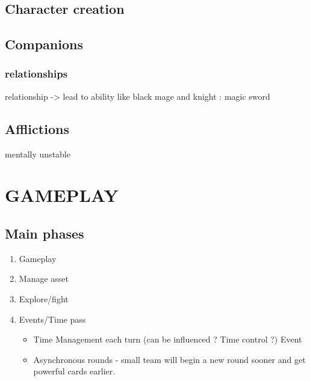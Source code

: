 \documentclass{report}
\begin{document}
	\section{Character creation}
	\section{Companions}
		\subsection*{relationships}
		relationship -> lead to ability like black mage and knight : magic sword

	\section{Afflictions}
		mentally unstable


\chapter{GAMEPLAY}
	\begin{comment}
		What kind of play does the player engage in? What genres are they? (Driving, shooting, platform, and so on.) How is the sequence of play broken up? (Levels? Rounds? Story chapters?) If there are multiple minigames, list them out by name and give short descriptions. If there are specific cool gameplay scenarios, list them. USPs from the concept overview should be included and briefly detailed here. Diagrams are good to illustrate game concepts.
		What game features are unique and capitalize on the platform’s hardware? (Hard drive, touch screen, multiple screen, memory card, and so on.) Provide examples.
	\end{comment}

	\section{Main phases}

	\begin{enumerate}
		\item Gameplay
	    \item Manage asset
	    \item Explore/fight
	    \item Events/Time pass
	    \begin{itemize}
	    	\item Time Management each turn (can be influenced ? Time control ?) Event
	    	\item Asynchronous rounds - small team will begin a new round sooner and get powerful cards earlier.
	    \end{itemize}
	\end{enumerate}
\end{document}
